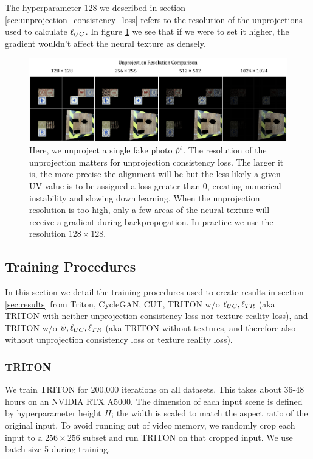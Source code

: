 	\bigskip
	
	The hyperparameter 128 we described in section \ref{sec:unprojection_consistency_loss} refers to the resolution of the unprojections used to calculate $\ell_{UC}$.
	In figure \ref{fig:unprojection_resolution_comparison} we see that if we were to set it higher, the gradient wouldn't affect the neural texture as densely.

	\begin{figure}[H]
		\begin{center}
			\includegraphics[width=400pt]{../images/unprojection_resolution_comparison.pdf}
		\end{center}
		\caption{
			Here, we unproject a single fake photo $\hat{p}^i$. The resolution of the unprojection matters for unprojection consistency loss. The larger it is, the more precise the alignment will be but the less likely a given UV value is to be assigned a loss greater than 0, creating numerical instability and slowing down learning. 
			When the unprojection resolution is too high, only a few areas of the neural texture will receive a gradient during backpropogation. In practice we use the resolution $128\times128$.
		}
		\label{fig:unprojection_resolution_comparison}
	\end{figure}

\subsection{Training Procedures}

	In this section we detail the training procedures used to create results in section \ref{sec:results} from Triton, CycleGAN, CUT,
		TRITON w/o $\ell_{UC},\ell_{TR}$ (aka TRITON with neither unprojection consistency loss nor texture reality loss), and
		TRITON w/o $\psi, \ell_{UC},\ell_{TR}$ (aka TRITON without textures, and therefore also without unprojection consistency loss or texture reality loss).

	\subsubsection{TRITON}
	\label{par:triton}
	We train TRITON for 200,000 iterations on all datasets. This takes about 36-48 hours on an NVIDIA RTX A5000. 
	The dimension of each input scene is defined by hyperparameter height $H$; the width is scaled to match the aspect ratio of the original input.
	To avoid running out of video memory, we randomly crop each input to a $256\times256$ subset and run TRITON on that cropped input.
	We use batch size 5 during training.
	
